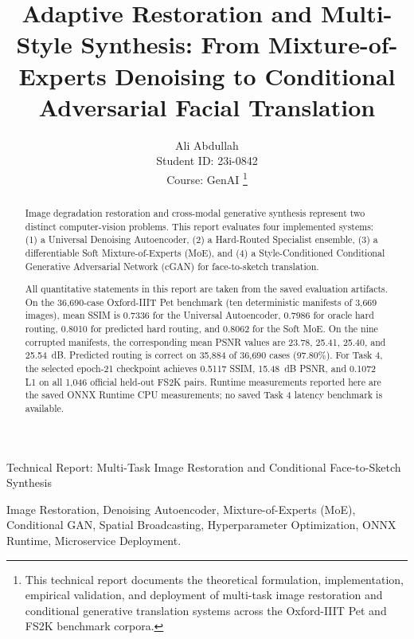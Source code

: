 \documentclass[journal,compsoc]{IEEEtran}
\begin{document}
\title{Adaptive Restoration and Multi-Style Synthesis: From Mixture-of-Experts Denoising to Conditional Adversarial Facial Translation}

\author{Ali Abdullah\\Student ID: 23i-0842\\Course: GenAI%
\thanks{This technical report documents the theoretical formulation, implementation, empirical validation, and deployment of multi-task image restoration and conditional generative translation systems across the Oxford-IIIT Pet and FS2K benchmark corpora.}
}

%
{Technical Report: Multi-Task Image Restoration and Conditional Face-to-Sketch Synthesis}

\maketitle

\begin{abstract}
Image degradation restoration and cross-modal generative synthesis represent two distinct computer-vision problems. This report evaluates four implemented systems: (1) a Universal Denoising Autoencoder, (2) a Hard-Routed Specialist ensemble, (3) a differentiable Soft Mixture-of-Experts (MoE), and (4) a Style-Conditioned Conditional Generative Adversarial Network (cGAN) for face-to-sketch translation.

All quantitative statements in this report are taken from the saved evaluation artifacts. On the 36,690-case Oxford-IIIT Pet benchmark (ten deterministic manifests of 3,669 images), mean SSIM is 0.7336 for the Universal Autoencoder, 0.7986 for oracle hard routing, 0.8010 for predicted hard routing, and 0.8062 for the Soft MoE. On the nine corrupted manifests, the corresponding mean PSNR values are 23.78, 25.41, 25.40, and 25.54~dB. Predicted routing is correct on 35,884 of 36,690 cases (97.80\%). For Task 4, the selected epoch-21 checkpoint achieves 0.5117 SSIM, 15.48~dB PSNR, and 0.1072 L1 on all 1,046 official held-out FS2K pairs. Runtime measurements reported here are the saved ONNX Runtime CPU measurements; no saved Task 4 latency benchmark is available.
\end{abstract}

\begin{IEEEkeywords}
Image Restoration, Denoising Autoencoder, Mixture-of-Experts (MoE), Conditional GAN, Spatial Broadcasting, Hyperparameter Optimization, ONNX Runtime, Microservice Deployment.
\end{IEEEkeywords}
\end{document}
